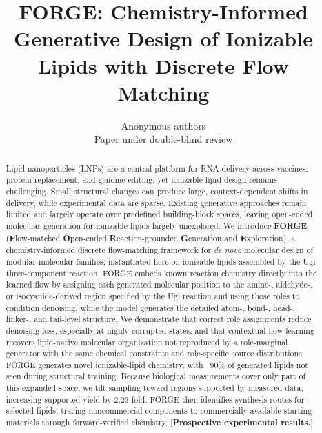 \documentclass{article}
\title{FORGE: Chemistry-Informed Generative Design of Ionizable Lipids with Discrete Flow Matching}
\author{Anonymous authors\\Paper under double-blind review}
\begin{document}
\maketitle

\begin{abstract}
Lipid nanoparticles (LNPs) are a central platform for RNA delivery across vaccines, protein replacement, 
and genome editing, yet ionizable lipid design remains challenging. Small structural changes can produce large, 
context-dependent shifts in delivery, while experimental data are sparse. Existing generative approaches remain limited 
and largely operate over predefined building-block spaces, leaving open-ended molecular generation for ionizable lipids largely unexplored.
We introduce \textbf{FORGE} (\textbf{F}low-matched \textbf{O}pen-ended
\textbf{R}eaction-grounded \textbf{G}eneration and \textbf{E}xploration), 
a chemistry-informed discrete flow-matching framework for \emph{de novo} molecular design of modular molecular families, 
instantiated here on ionizable lipids assembled by the Ugi three-component reaction. 
FORGE embeds known reaction chemistry directly 
into the learned flow by assigning each generated molecular position to the amine-, aldehyde-, or isocyanide-derived region specified 
by the Ugi reaction and using those roles to condition denoising, while the model generates 
the detailed atom-, bond-, head-, linker-, and tail-level structure. 
We demonstrate that correct role assignments reduce denoising loss, especially at highly corrupted states, 
and that contextual flow learning recovers lipid-native molecular organization not reproduced by a role-marginal 
generator with the same chemical constraints and role-specific source distributions. 
FORGE generates novel ionizable-lipid chemistry, with ~90\% of generated lipids not seen during 
structural training. Because biological measurements cover only part of this expanded space, 
we tilt sampling toward regions supported by measured data, increasing supported yield by 2.23-fold. 
FORGE then identifies synthesis routes for selected lipids, tracing noncommercial components to commercially 
available starting materials through forward-verified chemistry.
 [\textbf{Prospective experimental results.}]
\end{abstract}

\end{document}
